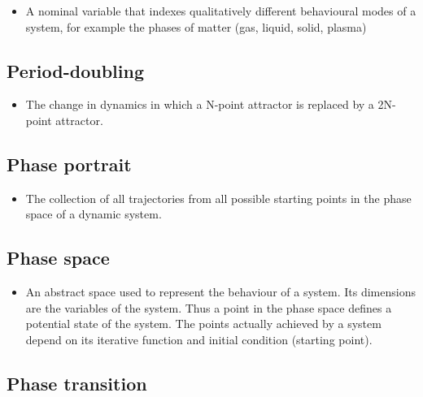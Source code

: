 \documentclass[12pt,]{book}
\providecommand{\tightlist}{%
  \setlength{\itemsep}{0pt}\setlength{\parskip}{0pt}}
\begin{document}
\begin{itemize}
\tightlist
\item
  A nominal variable that indexes qualitatively different behavioural modes of a system, for example the phases of matter (gas, liquid, solid, plasma)
\end{itemize}

\hypertarget{Peri53}{%
\subsection*{\texorpdfstring{\textbf{Period-doubling}}{Period-doubling}}\label{Peri53}}

\begin{itemize}
\tightlist
\item
  The change in dynamics in which a N-point attractor is replaced by a 2N-point attractor.
\end{itemize}

\hypertarget{Phas54}{%
\subsection*{\texorpdfstring{\textbf{Phase portrait}}{Phase portrait}}\label{Phas54}}

\begin{itemize}
\tightlist
\item
  The collection of all trajectories from all possible starting points in the phase space of a dynamic system.
\end{itemize}

\hypertarget{Phas55}{%
\subsection*{\texorpdfstring{\textbf{Phase space}}{Phase space}}\label{Phas55}}

\begin{itemize}
\tightlist
\item
  An abstract space used to represent the behaviour of a system. Its dimensions are the variables of the system. Thus a point in the phase space defines a potential state of the system. The points actually achieved by a system depend on its iterative function and initial condition (starting point).
\end{itemize}

\hypertarget{Phas56}{%
\subsection*{\texorpdfstring{\textbf{Phase transition}}{Phase transition}}\label{Phas56}}
\end{document}
